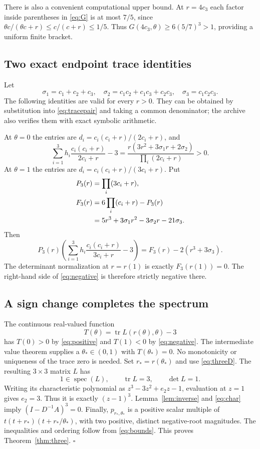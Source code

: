 \documentclass[11pt]{article}
\theoremstyle{remark}
\DeclareMathOperator{\tr}{tr}
\DeclareMathOperator{\spec}{spec}
\begin{document}
There is also a convenient computational upper bound. At $r=4c_3$ each factor
inside parentheses in \eqref{eq:G} is at most $7/5$, since
$\theta c/(\theta c+r)\leq c/(c+r)\leq1/5$.
Thus $G(4c_3,\theta)\geq6(5/7)^3>1$, providing a uniform finite bracket.

\subsection{Two exact endpoint trace identities}
Let
\[
 \sigma_1=c_1+c_2+c_3,\quad
 \sigma_2=c_1c_2+c_1c_3+c_2c_3,\quad \sigma_3=c_1c_2c_3.
\]
The following identities are valid for every $r>0$. They can be obtained by
substitution into \eqref{eq:tracepair} and taking a common denominator; the
archive also verifies them with exact symbolic arithmetic.

At $\theta=0$ the entries are $d_i=c_i(c_i+r)/(2c_i+r)$, and
\begin{equation}\label{eq:positive}
 \sum_{i=1}^3 h_i\frac{c_i(c_i+r)}{2c_i+r}-3
 =\frac{r(3r^2+3\sigma_1r+2\sigma_2)}{\prod_i(2c_i+r)}>0.
\end{equation}
At $\theta=1$ the entries are $d_i=c_i(c_i+r)/(3c_i+r)$. Put
\begin{align}
 P_3(r)&=\prod_i(3c_i+r),\notag\\
 F_3(r)&=6\prod_i(c_i+r)-P_3(r)\notag\\
       &=5r^3+3\sigma_1r^2-3\sigma_2r-21\sigma_3.
\end{align}
Then
\begin{equation}\label{eq:negative}
 P_3(r)\left(\sum_{i=1}^3 h_i\frac{c_i(c_i+r)}{3c_i+r}-3\right)
       =F_3(r)-2(r^3+3\sigma_3).
\end{equation}
The determinant normalization at $r=r(1)$ is exactly $F_3(r(1))=0$.
The right-hand side of \eqref{eq:negative} is therefore strictly negative there.

\subsection{A sign change completes the spectrum}
The continuous real-valued function
\[
 T(\theta)=\tr L(r(\theta),\theta)-3
\]
has $T(0)>0$ by \eqref{eq:positive} and $T(1)<0$ by
\eqref{eq:negative}. The intermediate value theorem supplies a
$\theta_*\in(0,1)$ with $T(\theta_*)=0$. No monotonicity or uniqueness of the
trace zero is needed. Set $r_*=r(\theta_*)$ and use \eqref{eq:threeD}.
The resulting $3\times3$ matrix $L$ has
\[
 1\in\spec(L),\qquad \tr L=3,\qquad \det L=1.
\]
Writing its characteristic polynomial as $z^3-3z^2+e_2z-1$, evaluation at $z=1$
gives $e_2=3$. Thus it is exactly $(z-1)^3$. Lemma~\ref{lem:inverse} and
\eqref{eq:char} imply $(I-D^{-1}A)^3=0$.
Finally, $p_{r_*,\theta_*}$ is a positive scalar multiple of
$t(t+r_*)(t+r_*/\theta_*)$, with two positive, distinct negative-root magnitudes.
The inequalities and ordering follow from \eqref{eq:bounds}.
This proves Theorem~\ref{thm:three}. \hfill$\square$
\end{document}
